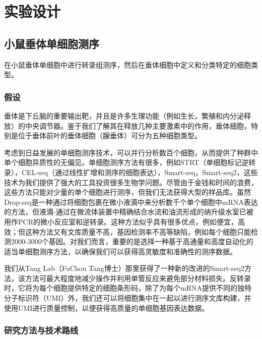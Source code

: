 
\chapter{实验设计}

\section{小鼠垂体单细胞测序}
  在小鼠垂体单细胞中进行转录组测序，然后在垂体细胞中定义和分类特定的细胞类型。
\subsection{假设}
  垂体是下丘脑的重要输出靶，并且是许多生理功能（例如生长，繁殖和内分泌释放）的中央调节器。鉴于我们了解其在释放几种主要激素中的作用，垂体细胞，特别是位于垂体前叶的垂体细胞（腺垂体）可分为五种细胞类型。

  考虑到日益发展的单细胞测序技术，可以并行分析数百个细胞，从而提供了种群中单个细胞异质性的无偏见。单细胞测序方法有很多，例如STRT（单细胞标记逆转录），CEL-seq（通过线性扩增和测序的细胞表达），Smart-seq，Smart-seq2，这些技术为我们提供了强大的工具投资很多生物学问题。尽管由于金钱和时间的浪费，这些方法只能对少量的单个细胞进行测序，但我们无法获得大型的样品库。虽然Drop-seq是一种通过将细胞包裹在微小液滴中来分析数千个单个细胞中mRNA表达的方法，但液滴-通过在微流体装置中精确结合水流和油流形成的纳升级水室已被用作PCR的微小反应室和逆转录。这种方法似乎具有很多优点，例如便宜，高效；但这种方法又有文库质量不高，基因检测率不高等缺陷，例如每个细胞只能检测2000-3000个基因。对我们而言，重要的是选择一种基于高通量和高度自动化的适当单细胞测序方法，以确保我们可以获得高灵敏度和准确性的测序数据。

  我们从Tang Lab（FuChou Tang博士）那里获得了一种新的改进的Smart-seq2方法，该方法可最大程度地减少操作并利用单管反应来避免部分材料损失。反转录时，它将为每个细胞提供特定的细胞条形码，除了为每个mRNA提供不同的独特分子标识符（UMI）外，我们还可以将细胞集中在一起以进行测序文库构建，并使用UMI进行质量控制，以便获得高质量的单细胞基因表达数据。
\subsection{研究方法与技术路线}
